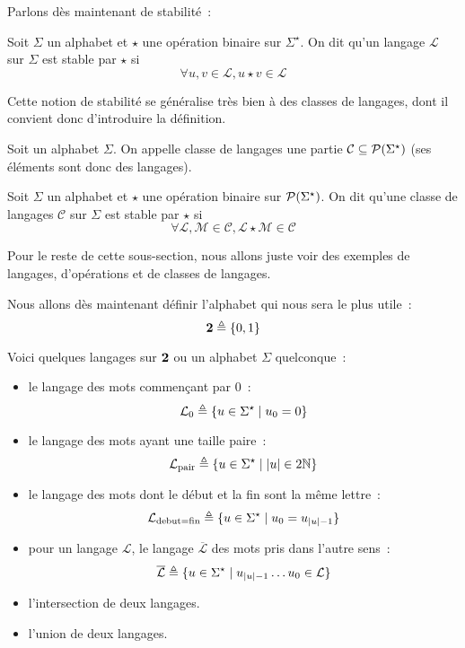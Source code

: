 Parlons dès maintenant de stabilité~:

\begin{definition}[Stabilité]
  Soit $\Sigma$ un alphabet et $\star$ une opération binaire sur $\Sigma^\star$.
  On dit qu'un langage $\mathcal L$ sur $\Sigma$ est stable par $\star$ si
  \[\forall u,v\in \mathcal L, u\star v \in \mathcal L\]
\end{definition}

Cette notion de stabilité se généralise très bien à des classes de langages,
dont il convient donc d'introduire la définition.

\begin{definition}
  Soit un alphabet $\Sigma$. On appelle classe de langages une partie
  $\mathcal C\subseteq \mathcal{P}(\Sigma^\star)$ (ses éléments sont donc des
  langages).
\end{definition}

\begin{definition}
  Soit $\Sigma$ un alphabet et $\star$ une opération binaire sur
  $\mathcal{P}(\Sigma^\star)$. On dit qu'une classe de langages $\mathcal C$ sur
  $\Sigma$ est stable par $\star$ si
  \[\forall \mathcal L,\mathcal M\in\mathcal C,
  \mathcal L\star \mathcal M\in\mathcal C\]
\end{definition}

Pour le reste de cette sous-section, nous allons juste voir des exemples de
langages, d'opérations et de classes de langages.

\begin{example}
  Nous allons dès maintenant définir l'alphabet qui nous sera le plus utile~:
  \[\boldsymbol{2} \triangleq \{0,1\}\]

  Voici quelques langages sur $\boldsymbol{2}$ ou un alphabet $\Sigma$ quelconque~:
  \begin{itemize}
  \item le langage des mots commençant par $0$~:
    \[\mathcal L_0 \triangleq \{u\in\Sigma^\star\mid u_0 = 0\}\]
  \item le langage des mots ayant une taille paire~:
    \[\mathcal L_{\mathrm{pair}} \triangleq \{u\in\Sigma^\star
    \mid |u|\in2\mathbb N\}\]
  \item le langage des mots dont le début et la fin sont la même lettre~:
    \[\mathcal L_{\mathrm{debut}=\mathrm{fin}}\triangleq
    \{u\in\Sigma^\star\mid u_0 = u_{|u| - 1}\}\]
  \item pour un langage $\mathcal L$, le langage $\overline{\mathcal L}$ des
    mots pris dans l'autre sens~:
    \[\overline{\mathcal L}\triangleq
    \{u\in\Sigma^\star\mid u_{|u|-1}\ldots u_0 \in \mathcal L\}\]
  \item l'intersection de deux langages.
  \item l'union de deux langages.
  \end{itemize}
\end{example}

